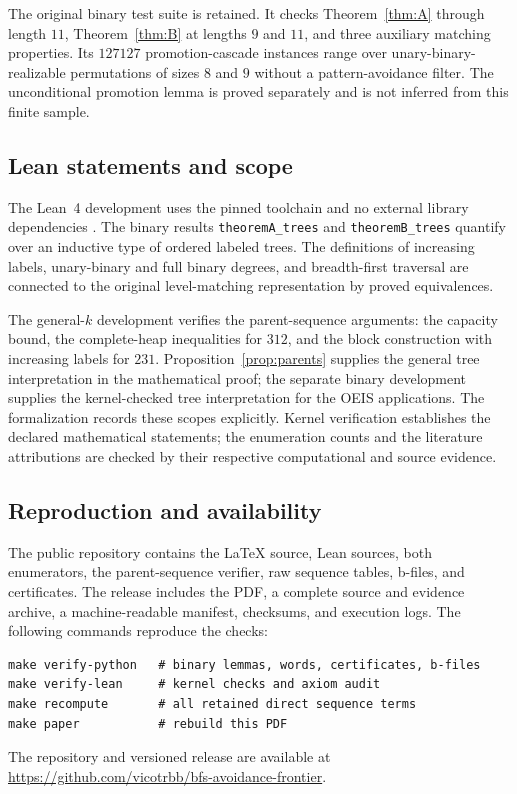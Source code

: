 \documentclass[11pt]{article}
\theoremstyle{definition}
\begin{document}
The original binary test suite is retained. It checks Theorem~\ref{thm:A} through length $11$, Theorem~\ref{thm:B} at lengths $9$ and $11$, and three auxiliary matching properties. Its $127127$ promotion-cascade instances range over unary-binary-realizable permutations of sizes $8$ and $9$ without a pattern-avoidance filter. The unconditional promotion lemma is proved separately and is not inferred from this finite sample.

\subsection{Lean statements and scope}
The Lean~4 development uses the pinned toolchain and no external library dependencies \cite{Lean4}. The binary results \texttt{theoremA\_trees} and \texttt{theoremB\_trees} quantify over an inductive type of ordered labeled trees. The definitions of increasing labels, unary-binary and full binary degrees, and breadth-first traversal are connected to the original level-matching representation by proved equivalences.

The general-$k$ development verifies the parent-sequence arguments: the capacity bound, the complete-heap inequalities for $312$, and the block construction with increasing labels for $231$. Proposition~\ref{prop:parents} supplies the general tree interpretation in the mathematical proof; the separate binary development supplies the kernel-checked tree interpretation for the OEIS applications. The formalization records these scopes explicitly. Kernel verification establishes the declared mathematical statements; the enumeration counts and the literature attributions are checked by their respective computational and source evidence.

\subsection{Reproduction and availability}
The public repository contains the LaTeX source, Lean sources, both enumerators, the parent-sequence verifier, raw sequence tables, b-files, and certificates. The release includes the PDF, a complete source and evidence archive, a machine-readable manifest, checksums, and execution logs. The following commands reproduce the checks:
\begin{verbatim}
make verify-python   # binary lemmas, words, certificates, b-files
make verify-lean     # kernel checks and axiom audit
make recompute       # all retained direct sequence terms
make paper           # rebuild this PDF
\end{verbatim}
The repository and versioned release are available at
\url{https://github.com/vicotrbb/bfs-avoidance-frontier}.
\end{document}
